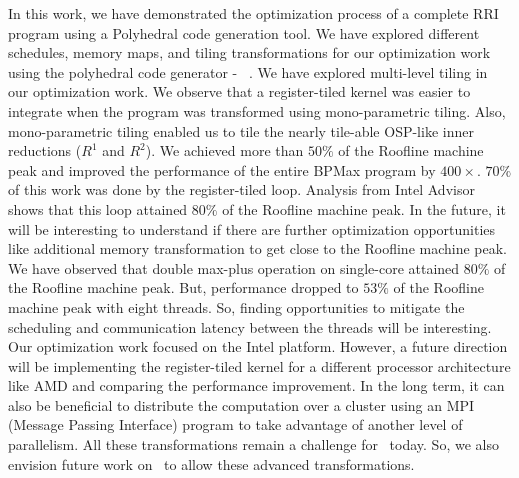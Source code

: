 In this work, we have demonstrated the optimization process of a complete RRI program using a Polyhedral code generation tool. We have explored different schedules, memory maps, and tiling transformations for our optimization work using the polyhedral code generator -  \alphaz\ .
We have explored multi-level tiling in our optimization work. We observe that a register-tiled kernel was easier to integrate when the program was transformed using mono-parametric tiling. Also, mono-parametric tiling enabled us to tile the nearly tile-able OSP-like inner reductions ($R^{1}$ and $R^{2}$). We achieved more than $50\%$ of the Roofline machine peak and improved the performance of the entire BPMax program by $400\times$. $70\%$ of this work was done by the register-tiled loop. Analysis from Intel Advisor shows that this loop attained $80\%$ of the Roofline machine peak. In the future, it will be interesting to understand if there are further optimization opportunities like additional memory transformation to get close to the Roofline machine peak.
We have observed that double max-plus operation on single-core attained $80\%$ of the Roofline machine peak. But, performance dropped to $53\%$ of the Roofline machine peak with eight threads. So, finding opportunities to mitigate the scheduling and communication latency between the threads will be interesting. Our optimization work focused on the Intel platform. However, a future direction will be implementing the register-tiled kernel for a different processor architecture like AMD and comparing the performance improvement. In the long term, it can also be beneficial to distribute the computation over a cluster using an MPI (Message Passing Interface) program to take advantage of another level of parallelism. All these transformations remain a challenge for \alphaz\ today. So, we also envision future work on \alphaz\ to allow these advanced transformations.


